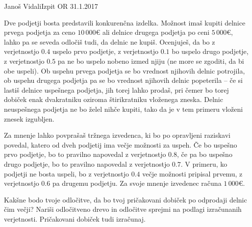 \begin{naloga}{Janoš Vidali}{Izpit OR 31.1.2017}
\begin{vprasanje}
Dve podjetji bosta predstavili konkurenčna izdelka.
Možnost imaš kupiti delnice prvega podjetja za ceno $10\,000 €$
ali delnice drugega podjetja po ceni $5\,000 €$,
lahko pa se seveda odločiš tudi, da delnic ne kupiš.
Ocenjuješ, da bo z ve\-rjet\-nost\-jo $0.4$ uspelo prvo podjetje,
z verjetnostjo $0.1$ bo uspelo drugo podjetje,
z verjetnostjo $0.5$ pa ne bo uspelo nobeno izmed njiju
(ne more se zgoditi, da bi obe uspeli).
Ob uspehu prvega podjetja se bo vrednost njihovih delnic potrojila,
ob uspehu drugega podjetja pa se bo vrednost njihovih delnic popeterila
-- če si lastiš delnice uspešnega podjetja, jih torej lahko prodaš,
pri čemer bo torej dobiček enak
dvakratniku oziroma štirikratniku vloženega zneska.
Delnic neuspešnega podjetja ne bo želel nihče kupiti,
tako da je v tem primeru vloženi znesek izgubljen.

Za mnenje lahko povprašaš tržnega izvedenca,
ki bo po opravljeni raziskavi povedal,
katero od dveh podjetij ima večje možnosti za uspeh.
Če bo uspešno prvo podjetje, bo to pravilno napovedal z verjetnostjo $0.8$,
če pa bo uspešno drugo podjetje,
bo to pravilno napovedal z verjetnostjo $0.7$.
V primeru, ko podjetji ne bosta uspeli,
bo z verjetnostjo $0.4$ večje možnosti pripisal prvemu,
z verjetnostjo $0.6$ pa drugemu podjetju.
Za svoje mnenje izvedenec računa $1\,000 €$.

Kakšne bodo tvoje odločitve,
da bo tvoj pričakovani dobiček po odprodaji delnic čim večji?
Nariši od\-lo\-čit\-ve\-no drevo
in odločitve sprejmi na podlagi izračunanih verjetnosti.
Pričakovani dobiček tudi izračunaj.
\end{vprasanje}


\end{naloga}
